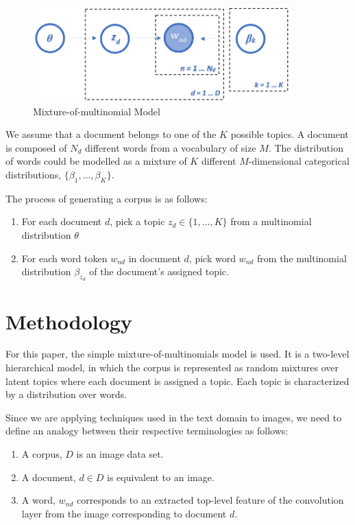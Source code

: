 \documentclass{article}
\begin{document}
\begin{figure}[]
  \centering
  \includegraphics[width=10cm]{CMM.png}
  \caption{Mixture-of-multinomial Model}
  \label{CMM}
\end{figure}

We assume that a document belongs to one of the $K$ possible topics. A document is composed of $N_d$ different words from a vocabulary of size $M$. The distribution of words could be modelled as a mixture of $K$ different $M$-dimensional categorical distributions, $\{\beta_1,\ldots,\beta_K\}$. 

The process of generating a corpus is as follows:
\begin{enumerate}
    \item For each document $d$, pick a topic $z_d \in \{1,\ldots, K\}$ from a multinomial distribution $\theta$ 
    \item For each word token $w_{nd}$ in document $d$, pick word $w_{nd}$ from the multinomial distribution $\beta_{z_d}$ of the document's assigned topic.
\end{enumerate}



\section{Methodology}
For this paper, the simple mixture-of-multinomials model is used. It is a two-level hierarchical model, in which the corpus is represented as random mixtures over latent topics where each document is assigned a topic. Each topic is characterized by a distribution over words. 

Since we are applying techniques used in the text domain to images, we need to define an analogy between their respective terminologies as follows:
\begin{enumerate}
    \item A corpus, $D$ is an image data set.
    \item A document, $d \in D$ is equivalent to an image.
    \item A word, $w_{nd}$ corresponds to an extracted top-level feature of the convolution layer from the image corresponding to document $d$.
\end{enumerate}
\end{document}
